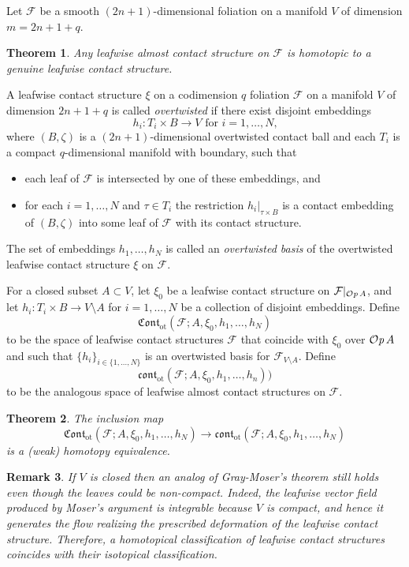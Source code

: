 \documentclass[12pt]{paper}
\theoremstyle{plain}
\newtheorem{theorem}{Theorem}[section]
\newtheorem{remark}[theorem]{Remark}
\theoremstyle{definition}
\newcommand{\Cont}{\mathfrak{Cont}}
\newcommand{\cont}{\mathfrak{cont}}
\newcommand{\ot}{\mathrm{ot}}
\newcommand{\FF}{\mathcal{F}}
\def\Op{{\mathcal O}{\it p}\,}
\numberwithin{figure}{section}
\begin{document}
   
 Let $\FF$ be a  smooth $(2n+1)$-dimensional foliation  on a manifold $V$ of dimension $m=2n+1+q$. 
 \begin{theorem}\label{thm:existence-fol}
 Any leafwise almost contact structure on $\FF$ is homotopic to a genuine leafwise contact structure.
 \end{theorem} 

A leafwise contact structure $\xi$ on a codimension $q$ foliation $\FF$ on a manifold $V$ of dimension $2n+1+q$ is called {\em overtwisted} if there exist disjoint embeddings 
$$
\mbox{$h_i:T_i\times B \to V$ for $i=1,\dots, N$,}
$$
where $(B, \zeta)$ is a $(2n+1)$-dimensional overtwisted contact ball and each $T_i$ is a compact $q$-dimensional manifold with boundary,
such that 
\begin{itemize}
\item each leaf of $\FF$ is intersected by one of these embeddings, and
\item for each $i=1,\dots, N$ and $\tau\in T_i$ the restriction $h_i|_{\tau \times B}$ is a contact embedding
of $(B, \zeta)$ into some leaf of $\FF$ with its contact structure.
\end{itemize}
The set of embeddings $h_1,\dots, h_N$ is called an {\em overtwisted  basis} of the overtwisted leafwise contact structure $\xi$ on $\FF$.

For a closed subset $A \subset V$, let $\xi_0$ be a leafwise contact structure on $\FF|_{\Op A}$, and let
$h_i:T_i\times B \to V\setminus A$ for $i=1,\dots, N$ be a collection of disjoint embeddings.
Define $$\Cont_\ot(\FF;A,\xi_0,h_1,\dots, h_N)$$ to be the space of leafwise contact structures   $\FF$ that coincide with 
$\xi_0$ over $\Op A$ and such that $\{h_i\}_{i\in\{1,\dots, N\}}$ is an overtwisted basis for $\FF_{V\setminus A}$.  Define 
$$\cont_\ot(\FF;A,\xi_0,h_1,\dots, h_n))$$ to be the analogous space of leafwise almost contact structures on $\FF$.
 
 \begin{theorem}\label{thm:classif-fol}
The inclusion map  $$\Cont_\ot(\FF;A,\xi_0,h_1,\dots, h_N)\to \cont_\ot(\FF;A,\xi_0,h_1,\dots, h_N)$$ is a (weak) homotopy  equivalence. 
 \end{theorem}
  \begin{remark}\label{rem:foliations}{\rm 
   If $V$ is closed then an analog of Gray-Moser's theorem still holds even though the leaves could be non-compact. Indeed, the leafwise vector field produced by Moser's argument  is integrable because $V$ is compact, and hence it generates the flow realizing the prescribed deformation of the leafwise contact structure.  Therefore, a homotopical classification of leafwise contact structures coincides with their isotopical classification. 
}
\end{remark}
  
\end{document}
